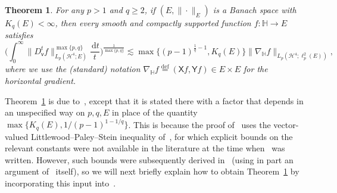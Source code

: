 \documentclass[11pt,reqno]{amsart}
\renewcommand{\H}{\mathbb{H}}
\newcommand{\cH}{\mathcal{H}}
\newcommand{\vv}{\mathsf{v}}
\newcommand{\XX}{\mathsf{X}}
\newcommand{\YY}{\mathsf{Y}}
\newcommand{\ud}[0]{\,\mathrm{d}}
\newcommand{\0}{\mathbf{0}}
\renewcommand{\1}{\mathbf 1}
\newcommand{\from}{\colon}
\newcommand{\eqdef}{\stackrel{\mathrm{def}}{=}}
\renewcommand{\ge}{\geqslant}
\newtheorem{thm}{Theorem}[section]
\theoremstyle{remark}
\begin{document}
\begin{thm}\label{thm:constants that we get LP} For any $p>1$ and $q\ge 2$, if $(E,\|\cdot\|_E)$ is a Banach space with $K_q(E)<\infty$, then every smooth and compactly supported function  $f\from \H\to E$ satisfies
\begin{equation}\label{eq:quote LN with K and p}
\bigg(\int_0^\infty \|D_{\vv}^tf\|_{L_p(\cH^4;E)}^{\max\{p,q\}}\frac{\ud t}{t}\bigg)^{\frac1{\max\{p,q\}}}\lesssim \max\Big\{(p-1)^{\frac{1}{q}-1},K_{q}(E)\Big\} \|\nabla_\H f\|_{L_p(\cH^4;\ell_p^2(E))},
\end{equation}
where we use the (standard) notation $\nabla_\H f\eqdef(\XX f,\YY f)\in E\times E$ for the horizontal gradient.
\end{thm}



Theorem~\ref{thm:constants that we get LP} is due to~\cite{LafforgueNaor}, except that it is stated there with a factor that depends in an unspecified way on $p,q,E$ in place of the quantity $\max\{K_{q}(E),1/(p-1)^{1-1/q}\}$. This is because the proof of~\cite{LafforgueNaor} uses the vector-valued Littlewood--Paley--Stein inequality of~\cite{MTX06}, for which  explicit bounds on the relevant constants were not available in the literature at the time when~\cite{LafforgueNaor} was written. However, such bounds were subsequently derived in~\cite{HN19} (using in part an argument of~\cite{LafforgueNaor} itself), so we will next briefly explain how to obtain Theorem~\ref{thm:constants that we get LP} by incorporating this input into~\cite{LafforgueNaor}.
\end{document}
